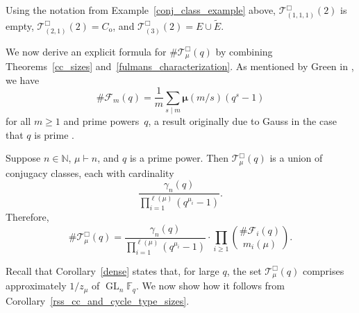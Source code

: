 \documentclass[Unicode,ALCO]{cedram}
\DeclareMathOperator{\GL}{GL}
\newcommand{\F}{\mathbb{F}}
\newcommand{\CF}{\mathcal{F}}
\newcommand{\N}{\mathbb{N}}
\newcommand{\CT}{\mathcal{T}}
\newcommand{\moebius}{\pmb{\mu}}
\begin{document}
\begin{example}
Using the notation from Example~\ref{conj_class_example} above,
\(\CT^\Box_{(1,1,1)} (2) \) is empty,
\(\CT^\Box_{(2,1)} (2) = C_{\mathrm{o}}\), and
\(\CT^\Box_{(3)} (2) = E \cup \tilde{E}\).
\end{example}

We now derive an explicit formula for \(\# \CT_\mu^\Box (q)\) by combining Theorems~\ref{cc_sizes} and~\ref{fulmans_characterization}.
As mentioned by Green in \cite{green}, we have
\begin{equation}
\label{size_of_Fm}
\# \CF_m (q) = \frac{1}{m} \sum_{s \mid m} \moebius(m/s)(q^s-1)
\end{equation}
for all \(m \geq 1\) and prime powers~\(q\),
a result originally due to Gauss in the case that \(q\) is prime \cite{gauss}.

\begin{corollary}
\label{rss_cc_and_cycle_type_sizes}
Suppose \(n \in \N\), \(\mu \vdash n\), and \(q\) is a prime power.
Then \(\CT_\mu^\Box (q)\) is a union of conjugacy classes, each with cardinality
\[
\frac{\gamma_n(q)}{\prod_{i=1}^{\ell(\mu)} (q^{\mu_i}-1)}.
\]
Therefore,
\[
\# \CT_\mu^\Box (q)
=
\frac{\gamma_n(q)}{\prod_{i=1}^{\ell(\mu)} (q^{\mu_i}-1)}
\cdot
\prod_{i \geq 1}
\binom{\# \CF_i (q)}{m_i(\mu)}.
\]
\end{corollary}

Recall that Corollary~\ref{dense} states that, for large \(q\), the set \(\CT^\Box_\mu (q)\) comprises approximately \(1 / z_\mu\) of \(\GL_n \F_q\).
We now show how it follows from Corollary~\ref{rss_cc_and_cycle_type_sizes}.
\end{document}

